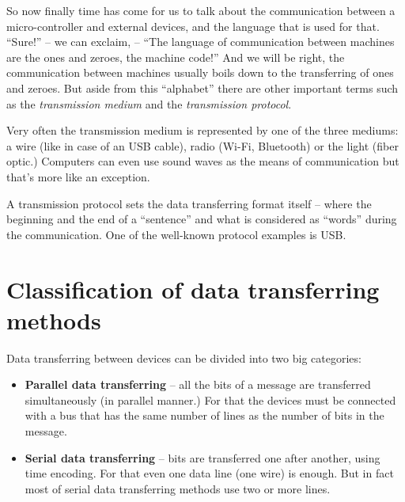 \documentclass[../sparc.tex]{subfiles}
\begin{document}

So now finally time has come for us to talk about the communication between a
micro-controller and external devices, and the language that is used for that.
``Sure!'' -- we can exclaim, -- ``The language of communication between machines
are the ones and zeroes, the machine code!''  And we will be right, the
communication between machines usually boils down to the transferring of ones
and zeroes.  But aside from this ``alphabet'' there are other important terms
such as the \emph{transmission medium} and the \emph{transmission protocol}.

Very often the transmission medium is represented by one of the three mediums: a
wire (like in case of an USB cable), radio (Wi-Fi, Bluetooth) or the light
(fiber optic.)  Computers can even use sound waves as the means of communication
but that's more like an exception.

A transmission protocol sets the data transferring format itself -- where the
beginning and the end of a ``sentence'' and what is considered as ``words''
during the communication.  One of the well-known protocol examples is USB.

\section{Classification of data transferring methods}


Data transferring between devices can be divided into two big categories:

\begin{itemize}
\item \textbf{Parallel data transferring} -- all the bits of a message are
  transferred simultaneously (in parallel manner.)  For that the devices must be
  connected with a bus that has the same number of lines as the number of bits
  in the message.
\item \textbf{Serial data transferring} -- bits are transferred one after
  another, using time encoding.  For that even one data line (one wire) is
  enough.  But in fact most of serial data transferring methods use two or more
  lines.
\end{itemize}
\end{document}
